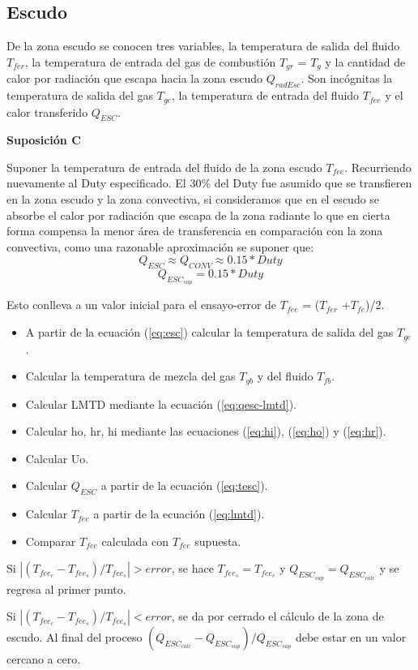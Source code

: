 \subsection{Escudo}
\par De la zona escudo se conocen tres variables, la temperatura de salida del fluido $T_{fer}$, la temperatura de entrada del gas de combustión $T_{gr}$ = $T_g$ y la cantidad de calor por radiación que escapa hacia la zona escudo $Q_{radEsc}$. Son incógnitas la temperatura de salida del gas $T_{ge}$, la temperatura de entrada del fluido $T_{fee}$ y el calor transferido $Q_{ESC}$.
\par \textbf{Suposición C}
\par Suponer la temperatura de entrada del fluido de la zona escudo $T_{fee}$. Recurriendo nuevamente al Duty especificado. El 30\% del Duty fue asumido que se transfieren en la zona escudo y la zona convectiva, si consideramos que en el escudo se absorbe el calor por radiación que escapa de la zona radiante lo que en cierta forma compensa la menor área de transferencia en comparación con la zona convectiva, como una razonable aproximación se suponer que:
\begin{equation*} Q_{ESC} \approx Q_{CONV} \approx 0.15 * Duty \end{equation*}
\begin{equation*} Q_{ESC_{sup}} = 0.15 * Duty \end{equation*}
\par Esto conlleva a un valor inicial para el ensayo-error de $T_{fee}$ = ($T_{fer}$ +$T_{fe}$)/2. 

\begin{itemize}
\item A partir de la ecuación (\ref{eq:esc}) calcular la temperatura de salida del gas $T_{ge}$.
\item Calcular la temperatura de mezcla del gas $T_{gb}$ y del fluido $T_{fb}$.
\item Calcular LMTD mediante la ecuación (\ref{eq:qesc-lmtd}).
\item Calcular ho, hr, hi mediante las ecuaciones (\ref{eq:hi}), (\ref{eq:ho}) y (\ref{eq:hr}).
\item Calcular Uo.
\item Calcular $Q_{ESC}$ a partir de la ecuación (\ref{eq:tesc}).
\item Calcular $T_{fee}$ a partir de la ecuación (\ref{eq:lmtd}).
\item Comparar $T_{fee}$ calculada con $T_{fee}$ supuesta.
\end{itemize}
\par Si $|(T_{fee_c} - T_{fee_s})/T_{fee_s}| > error$, se hace $T_{fee_s} = T_{fee_c}$ y $Q_{ESC_{sup}} = Q_{ESC_{calc}}$ y se regresa al primer punto.
\par Si $|(T_{fee_c} - T_{fee_s})/T_{fee_s} | < error$, se da por cerrado el cálculo de la zona de escudo. Al final del proceso $(Q_{ESC_{calc}} - Q_{ESC_{sup}})/ Q_{ESC_{sup}}$ debe estar en un valor cercano a cero.

